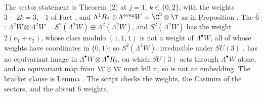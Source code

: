 The sector statement is Theorem (2) at $j = 1$, $k \in \{0, 2\}$, with the weights $3 - 2k = 3, -1$ of Fact , and $\Lambda^{1}R_{2} \otimes \Lambda^{\mathrm{even}}W = \C^{2} \otimes \T$ as in Proposition . The $\bar{6}$: $\Lambda^{2}W \otimes \Lambda^{2}W = S^{2}(\Lambda^{2}W) \oplus \Lambda^{2}(\Lambda^{2}W)$, and $S^{2}(\Lambda^{2}W)$ has the weight $2(e_{1} + e_{2})$, whose class modulo $(1,1,1)$ is not a weight of $\Lambda^{\bullet}W$, all of whose weights have coordinates in $\{0, 1\}$; so $S^{2}(\Lambda^{2}W)$, irreducible under $SU(3)$ \cite[\S 15.3]{FultonHarris1991}, has no equivariant image in $\Lambda^{\bullet}W \otimes \Lambda^{\bullet}R_{2}$, on which $SU(3)$ acts through $\Lambda^{\bullet}W$ alone, and an equivariant map from $\T \otimes \T$ must kill it, so is not an embedding. The bracket clause is Lemma . The script checks the weights, the Casimirs of the sectors, and the absent $\bar{6}$ weights.
